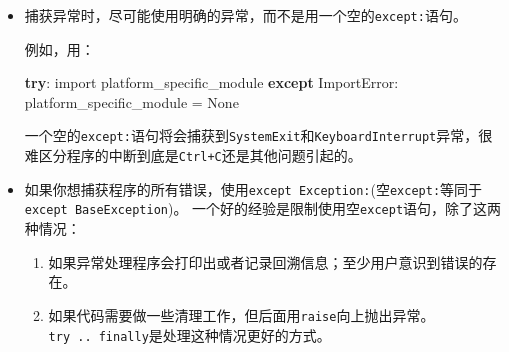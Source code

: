 \documentclass[ignorenonframetext,9pt]{beamer}
\newenvironment{Shaded}{}{}
\newcommand{\ControlFlowTok}[1]{\textcolor[rgb]{0.00,0.44,0.13}{\textbf{#1}}}
\newcommand{\ImportTok}[1]{#1}
\newcommand{\NormalTok}[1]{#1}
\newcommand{\OperatorTok}[1]{\textcolor[rgb]{0.40,0.40,0.40}{#1}}
\newcommand{\PreprocessorTok}[1]{\textcolor[rgb]{0.74,0.48,0.00}{#1}}
\newcommand{\VariableTok}[1]{\textcolor[rgb]{0.10,0.09,0.49}{#1}}
\providecommand{\tightlist}{%
  \setlength{\itemsep}{0pt}\setlength{\parskip}{0pt}}
\begin{document}
\begin{frame}[fragile]

\begin{itemize}
\item
  捕获异常时，尽可能使用明确的异常，而不是用一个空的\texttt{except:}语句。

  例如，用：

\begin{Shaded}
\begin{Highlighting}[]
\ControlFlowTok{try}\NormalTok{:}
    \ImportTok{import}\NormalTok{ platform_specific_module}
\ControlFlowTok{except} \PreprocessorTok{ImportError}\NormalTok{:}
\NormalTok{    platform_specific_module }\OperatorTok{=} \VariableTok{None}
\end{Highlighting}
\end{Shaded}

  一个空的\texttt{except:}语句将会捕获到\texttt{SystemExit}和\texttt{KeyboardInterrupt}异常，很难区分程序的中断到底是\texttt{Ctrl+C}还是其他问题引起的。
\end{itemize}

\end{frame}
\begin{frame}[fragile]
\begin{itemize}
  \item
  如果你想捕获程序的所有错误，使用\texttt{except\ Exception:}(空\texttt{except:}等同于\texttt{except\ BaseException})。
一个好的经验是限制使用空\texttt{except}语句，除了这两种情况：

  \begin{enumerate}
  \tightlist
  \item
    如果异常处理程序会打印出或者记录回溯信息；至少用户意识到错误的存在。
  \item
    如果代码需要做一些清理工作，但后面用\texttt{raise}向上抛出异常。\texttt{try\ ..\ finally}是处理这种情况更好的方式。
  \end{enumerate}
\end{itemize}

\end{frame}
\end{document}
